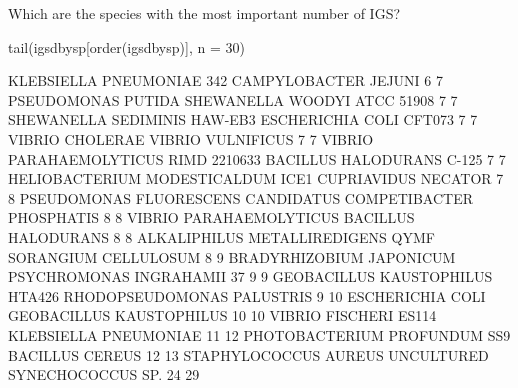 \documentclass{article}
\begin{document}
Which are the species with the most important number of IGS?

\begin{Schunk}
\begin{Sinput}
 tail(igsdbysp[order(igsdbysp)], n = 30)
\end{Sinput}
\begin{Soutput}
           KLEBSIELLA PNEUMONIAE 342                 CAMPYLOBACTER JEJUNI 
                                   6                                    7 
                  PSEUDOMONAS PUTIDA         SHEWANELLA WOODYI ATCC 51908 
                                   7                                    7 
        SHEWANELLA SEDIMINIS HAW-EB3              ESCHERICHIA COLI CFT073 
                                   7                                    7 
                     VIBRIO CHOLERAE                    VIBRIO VULNIFICUS 
                                   7                                    7 
VIBRIO PARAHAEMOLYTICUS RIMD 2210633            BACILLUS HALODURANS C-125 
                                   7                                    7 
   HELIOBACTERIUM MODESTICALDUM ICE1                  CUPRIAVIDUS NECATOR 
                                   7                                    8 
             PSEUDOMONAS FLUORESCENS  CANDIDATUS COMPETIBACTER PHOSPHATIS 
                                   8                                    8 
             VIBRIO PARAHAEMOLYTICUS                  BACILLUS HALODURANS 
                                   8                                    8 
   ALKALIPHILUS METALLIREDIGENS QYMF                 SORANGIUM CELLULOSUM 
                                   8                                    9 
            BRADYRHIZOBIUM JAPONICUM           PSYCHROMONAS INGRAHAMII 37 
                                   9                                    9 
     GEOBACILLUS KAUSTOPHILUS HTA426           RHODOPSEUDOMONAS PALUSTRIS 
                                   9                                   10 
                    ESCHERICHIA COLI             GEOBACILLUS KAUSTOPHILUS 
                                  10                                   10 
               VIBRIO FISCHERI ES114                KLEBSIELLA PNEUMONIAE 
                                  11                                   12 
        PHOTOBACTERIUM PROFUNDUM SS9                      BACILLUS CEREUS 
                                  12                                   13 
               STAPHYLOCOCCUS AUREUS         UNCULTURED SYNECHOCOCCUS SP. 
                                  24                                   29 
\end{Soutput}
\end{Schunk}
\end{document}
